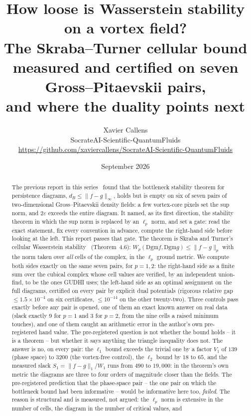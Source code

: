 \documentclass[11pt,a4paper]{article}
\title{\textbf{How loose is Wasserstein stability on a vortex field?}\\
\large The Skraba--Turner cellular bound measured and certified on seven Gross--Pitaevskii pairs,\\
and where the duality points next}
\author{Xavier Callens\\
\small SocrateAI-Scientific-QuantumFluids\\
\small \url{https://github.com/xaviercallens/SocrateAI-Scientific-QuantumFluids}}
\date{September 2026}
\newcommand{\dB}{d_{B}}
\newcommand{\Dgm}{\mathrm{Dgm}}
\begin{document}
\maketitle

\begin{abstract}
\noindent
The previous report in this series~\cite{Callens2026Loop} found that the bottleneck stability theorem
for persistence diagrams, $\dB\le\|f-g\|_\infty$, holds but is empty on six of seven pairs of
two-dimensional Gross--Pitaevskii density fields: a few vortex-core pixels set the sup norm, and
$2\varepsilon$ exceeds the entire diagram. It named, as its first direction, the stability theorem in
which the sup norm is replaced by an $\ell_p$ norm, and set a gate: read the exact statement, fix every
convention in advance, compute the right-hand side before looking at the left. This report passes that
gate. The theorem is Skraba and Turner's cellular Wasserstein stability~\cite{SkrabaTurner2020}
(Theorem~4.6): $W_p(\Dgm f,\Dgm g)\le\|f-g\|_p$ with the norm taken over \emph{all} cells of the
complex, in the $\ell_p$ ground metric. We compute both sides exactly on the same seven pairs, for
$p=1,2$: the right-hand side as a finite sum over the cubical complex whose cell values are verified,
by an independent union-find, to be the ones GUDHI uses; the left-hand side as an optimal assignment on
the full diagrams, certified on every pair by explicit dual potentials (rigorous relative gap
$\le1.5\times10^{-4}$ on six certificates, $\le10^{-14}$ on the other twenty-two). Three controls pass exactly
before any pair is opened, one of them an exact known answer on real data (slack exactly $9$ for $p=1$
and $3$ for $p=2$, from the nine cells a raised minimum touches), and one of them caught an arithmetic
error in the author's own pre-registered hand value. The pre-registered question is not whether the
bound holds -- it is a theorem -- but whether it says anything the triangle inequality does not.
The answer is no, on every pair: the $\ell_1$ bound exceeds the trivial one by a factor $V_1$ of
$139$ (phase space) to $3200$ (the vortex-free control), the $\ell_2$ bound by $18$ to $65$, and the
measured slack $S_1=\|f-g\|_1/W_1$ runs from $490$ to $19{,}000$: in the theorem's own metric the
diagrams are three to four orders of magnitude closer than the fields. The pre-registered prediction
that the phase-space pair -- the one pair on which the bottleneck bound had been informative -- would
be informative here too, \emph{failed}. The reason is structural and is measured, not argued: the
$\ell_p$ norm is extensive in the number of cells, the diagram in the number of critical values, and

\end{abstract}
\end{document}
